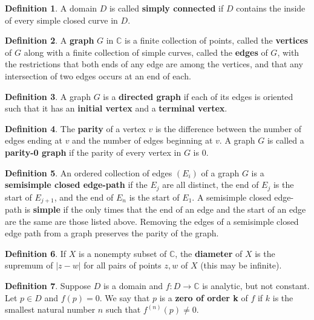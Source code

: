 \documentclass[a4paper]{article}
\theoremstyle{definition}
\newtheorem{definition}{Definition}
\begin{document}
	\begin{definition}
		A domain $D$ is called \textbf{simply connected} if $D$ contains the inside of every simple closed curve in $D$.
	\end{definition}
	
	\begin{definition}
		A \textbf{graph} $G$ in $\mathbb{C}$ is a finite collection of points, called the \textbf{vertices} of $G$ along with a finite collection of simple curves, called the \textbf{edges} of $G$, with the restrictions that both ends of any edge are among the vertices, and that any intersection of two edges occurs at an end of each.
	\end{definition}
	
	\begin{definition}
		A graph $G$ is a \textbf{directed graph} if each of its edges is oriented such that it has an \textbf{initial vertex} and a \textbf{terminal vertex}.
	\end{definition}
	
	\begin{definition}
		The \textbf{parity} of a vertex $v$ is the difference between the number of edges ending at $v$ and the number of edges beginning at $v$. A graph $G$ is called a \textbf{parity-0 graph} if the parity of every vertex in $G$ is 0.
	\end{definition}
	
	\begin{definition}
		An ordered collection of edges $(E_{i})$ of a graph $G$ is a \textbf{semisimple closed edge-path} if the $E_{j}$ are all distinct, the end of $E_{j}$ is the start of $E_{j+1}$, and the end of $E_{n}$ is the start of $E_{1}$. A semisimple closed edge-path is \textbf{simple} if the only times that the end of an edge and the start of an edge are the same are those listed above. Removing the edges of a semisimple closed edge path from a graph preserves the parity of the graph.
	\end{definition}
	
	\begin{definition}
		If $X$ is a nonempty subset of $\mathbb{C}$, the \textbf{diameter} of $X$ is the supremum of $|z-w|$ for all pairs of points $z, w$ of $X$ (this may be infinite).
	\end{definition}
	
	\begin{definition}
		Suppose $D$ is a domain and $f: D \rightarrow \mathbb{C}$ is analytic, but not constant. Let $p \in D$ and $f(p) = 0$. We say that $p$ is a \textbf{zero of order k} of $f$ if $k$ is the smallest natural number $n$ such that $f^{(n)}(p) \neq 0$.
	\end{definition}
	
\end{document}
